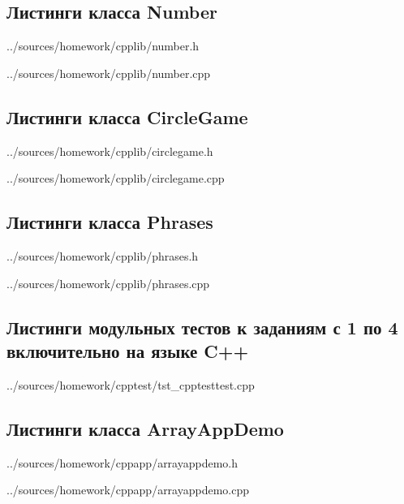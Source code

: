 \documentclass[12pt,a4paper]{report}
\begin{document}
\subsection*{Листинги класса Number}

{../sources/homework/cpplib/number.h}

{../sources/homework/cpplib/number.cpp}
\newpage

\subsection*{Листинги класса CircleGame}

{../sources/homework/cpplib/circlegame.h}

{../sources/homework/cpplib/circlegame.cpp}
\newpage

\subsection*{Листинги класса Phrases}

{../sources/homework/cpplib/phrases.h}

{../sources/homework/cpplib/phrases.cpp}
\newpage

\subsection*{Листинги модульных тестов к заданиям с 1 по 4 включительно на языке C++}

{../sources/homework/cpptest/tst_cpptesttest.cpp}
\newpage


\subsection*{Листинги класса ArrayAppDemo}

{../sources/homework/cppapp/arrayappdemo.h}

{../sources/homework/cppapp/arrayappdemo.cpp}
\end{document}
